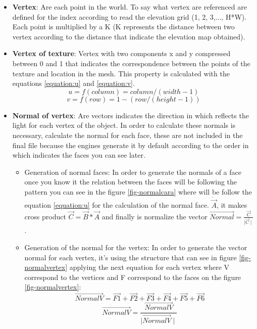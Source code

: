 \documentclass[10pt,a4paper,twocolumn,twoside]{article}
\begin{document}
\begin{itemize}
  \item \textbf{Vertex}: Are each point in the world. To say what vertex are referenced are defined for the index according to read the elevation grid (1, 2, 3,..., H*W). Each point is multiplied by a K (K represents the distance between two vertex according to the distance that indicate the elevation map obtained).

  \item {
    \textbf{Vertex of texture}: Vertex with two components x and y compressed between 0 and 1 that indicates the correspondence between the points of the texture and location in the mesh. This property is calculated with the equations \ref{equation:u} and \ref{equation:v}.
    \begin{equation}
    \label{equation:u}
    u = f(column) = column / (width - 1)
    \end{equation}
    \begin{equation}
    \label{equation:v}
    v = f(row) = 1 - (row / (height - 1))
    \end{equation}
  }

  \item \textbf{Normal of vertex}: Are vectors indicates the direction in which reflects the light for each vertex of the object. In order to calculate these normals is necessary, calculate the normal for each face, these are not included in the final file because the engines generate it by default according to the order in which indicates the faces you can see later. 
  \begin{itemize}
    \item {
      Generation of normal faces: In order to generate the normals of a face once you know it the relation between the faces will be following the pattern you can see in the figure \ref{fig-normalcara} where will be follow the equation \ref{equation:u} for the calculation of the normal face. $\dot{\vec{A}}$, it makes cross product $\vec{C} = \vec{B}*\vec{A}$ and finally is normalize the vector $\vec{Normal} = \frac{\vec{C}}{\mid\vec{C}\mid}$.
    }
    \item {
		Generation of the normal for the vertex: In order to generate the vector normal for each vertex, it's using the structure that can see in figure \ref{fig-normalvertex} applying the next equation for each vertex where V correspond to the vertices and F correspond to the faces on the figure \ref{fig-normalvertex}:
      \begin{equation}
      \vec{NormalV} = \vec{F1} + \vec{F2} + \vec{F3} + \vec{F4} + \vec{F5} + \vec{F6}
      \end{equation}
      \begin{equation}
      \vec{NormalV} = \frac{\vec{NormalV}}{\mid\vec{NormalV}\mid}
      \end{equation}
    }
  \end{itemize}


\end{itemize}
\end{document}

